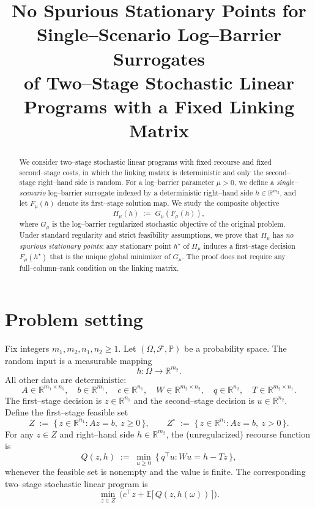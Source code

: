 \documentclass[11pt]{article}
\title{No Spurious Stationary Points for Single--Scenario Log--Barrier Surrogates\\
of Two--Stage Stochastic Linear Programs with a Fixed Linking Matrix}
\author{}
\date{}
\newcommand{\R}{\mathbb{R}}
\newcommand{\E}{\mathbb{E}}
\newcommand{\bbP}{\mathbb{P}}
\theoremstyle{plain}
\theoremstyle{definition}
\begin{document}
\maketitle

\begin{abstract}
We consider two--stage stochastic linear programs with fixed recourse and fixed second--stage costs,
in which the linking matrix is deterministic and only the second--stage right--hand side is random.
For a log--barrier parameter $\mu>0$, we define a \emph{single--scenario} log--barrier surrogate
indexed by a deterministic right--hand side $h\in\R^{m_2}$, and let $F_\mu(h)$ denote its
first--stage solution map. We study the composite objective
\[
H_\mu(h)\;:=\; G_\mu(F_\mu(h)),
\]
where $G_\mu$ is the log--barrier regularized stochastic objective of the original problem.
Under standard regularity and strict feasibility assumptions, we prove that $H_\mu$ has
\emph{no spurious stationary points}: any stationary point $h^\star$ of $H_\mu$ induces a first--stage
decision $F_\mu(h^\star)$ that is the unique global minimizer of $G_\mu$.
The proof does not require any full--column--rank condition on the linking matrix.
\end{abstract}

\section{Problem setting}

Fix integers $m_1,m_2,n_1,n_2\ge 1$. Let $(\Omega,\mathcal{F},\bbP)$ be a probability space.
The random input is a measurable mapping
\[
h:\Omega\to\R^{m_2}.
\]
All other data are deterministic:
\[
A\in\R^{m_1\times n_1},\quad b\in\R^{m_1},\quad c\in\R^{n_1},\quad
W\in\R^{m_2\times n_2},\quad q\in\R^{n_2},\quad T\in\R^{m_2\times n_1}.
\]
The first--stage decision is $z\in\R^{n_1}$ and the second--stage decision is $u\in\R^{n_2}$.
Define the first--stage feasible set
\[
Z \;:=\; \{\, z\in\R^{n_1} : Az=b,\ z\ge 0 \,\},
\qquad
Z^\circ \;:=\; \{\, z\in\R^{n_1} : Az=b,\ z>0 \,\}.
\]
For any $z\in Z$ and right--hand side $h\in\R^{m_2}$, the (unregularized) recourse function is
\begin{equation}\label{eq:Q}
Q(z,h) \;:=\; \min_{u\ge 0}\ \{\, q^\top u : Wu = h - Tz \,\},
\end{equation}
whenever the feasible set is nonempty and the value is finite. The corresponding two--stage
stochastic linear program is
\[
\min_{z\in Z}\ \Big(c^\top z + \E\big[\,Q(z,h(\omega))\,\big]\Big).
\]
\end{document}

